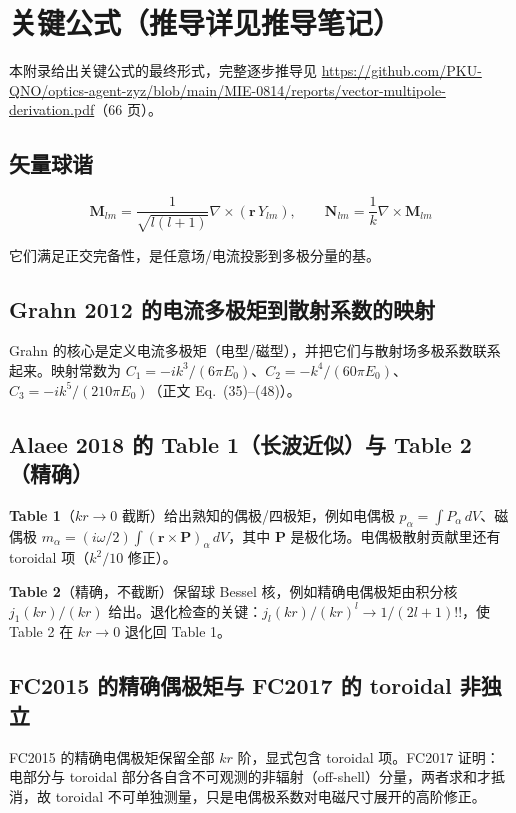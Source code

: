 \section{关键公式（推导详见推导笔记）}

本附录给出关键公式的最终形式，完整逐步推导见 \url{https://github.com/PKU-QNO/optics-agent-zyz/blob/main/MIE-0814/reports/vector-multipole-derivation.pdf}（66 页）。

\subsection{矢量球谐}

\[
\mathbf M_{lm} = \frac{1}{\sqrt{l(l+1)}}\nabla\times(\mathbf r\,Y_{lm}),\qquad
\mathbf N_{lm} = \frac{1}{k}\nabla\times\mathbf M_{lm}
\]

它们满足正交完备性，是任意场/电流投影到多极分量的基。

\subsection{Grahn 2012 的电流多极矩到散射系数的映射}

Grahn 的核心是定义电流多极矩（电型/磁型），并把它们与散射场多极系数联系起来。映射常数为
$C_1=-ik^3/(6\pi E_0)$、$C_2=-k^4/(60\pi E_0)$、$C_3=-ik^5/(210\pi E_0)$（正文 Eq.~(35)--(48)）。

\subsection{Alaee 2018 的 Table 1（长波近似）与 Table 2（精确）}

\textbf{Table 1}（$kr\to0$ 截断）给出熟知的偶极/四极矩，例如电偶极 $p_\alpha=\int P_\alpha\,dV$、磁偶极 $m_\alpha=(i\omega/2)\int(\mathbf r\times\mathbf P)_\alpha\,dV$，其中 $\mathbf P$ 是极化场。电偶极散射贡献里还有 toroidal 项（$k^2/10$ 修正）。

\textbf{Table 2}（精确，不截断）保留球 Bessel 核，例如精确电偶极矩由积分核 $j_1(kr)/(kr)$ 给出。退化检查的关键：$j_l(kr)/(kr)^l\to1/(2l+1)!!$，使 Table 2 在 $kr\to0$ 退化回 Table 1。

\subsection{FC2015 的精确偶极矩与 FC2017 的 toroidal 非独立}

FC2015 的精确电偶极矩保留全部 $kr$ 阶，显式包含 toroidal 项。FC2017 证明：电部分与 toroidal 部分各自含不可观测的非辐射（off-shell）分量，两者求和才抵消，故 toroidal 不可单独测量，只是电偶极系数对电磁尺寸展开的高阶修正。
